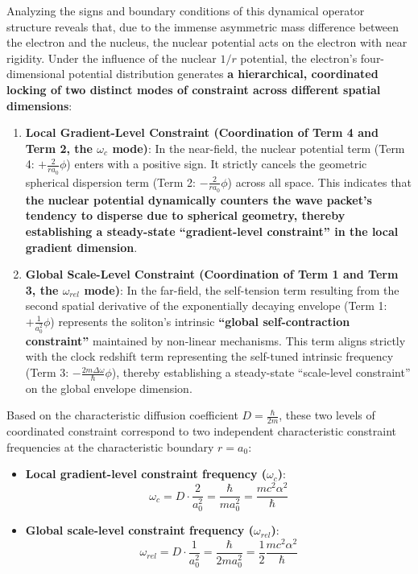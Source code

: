 \documentclass[12pt, a4paper]{article}
\begin{document}
Analyzing the signs and boundary conditions of this dynamical operator structure reveals that, due to the immense asymmetric mass difference between the electron and the nucleus, the nuclear potential acts on the electron with near rigidity. Under the influence of the nuclear $1/r$ potential, the electron's four-dimensional potential distribution generates \textbf{a hierarchical, coordinated locking of two distinct modes of constraint across different spatial dimensions}:
\begin{enumerate}
    \item \textbf{Local Gradient-Level Constraint (Coordination of Term 4 and Term 2, the $\omega_c$ mode)}: In the near-field, the nuclear potential term (Term 4: $+\frac{2}{ra_0}\phi$) enters with a positive sign. It strictly cancels the geometric spherical dispersion term (Term 2: $-\frac{2}{ra_0}\phi$) across all space. This indicates that \textbf{the nuclear potential dynamically counters the wave packet's tendency to disperse due to spherical geometry, thereby establishing a steady-state ``gradient-level constraint'' in the local gradient dimension}.
    \item \textbf{Global Scale-Level Constraint (Coordination of Term 1 and Term 3, the $\omega_{rel}$ mode)}: In the far-field, the self-tension term resulting from the second spatial derivative of the exponentially decaying envelope (Term 1: $+\frac{1}{a_0^2}\phi$) represents the soliton's intrinsic \textbf{``global self-contraction constraint''} maintained by non-linear mechanisms. This term aligns strictly with the clock redshift term representing the self-tuned intrinsic frequency (Term 3: $-\frac{2m\Delta\omega}{\hbar}\phi$), thereby establishing a steady-state ``scale-level constraint'' on the global envelope dimension.
\end{enumerate}

Based on the characteristic diffusion coefficient $D = \frac{\hbar}{2m}$, these two levels of coordinated constraint correspond to two independent characteristic constraint frequencies at the characteristic boundary $r = a_0$:
\begin{itemize}
    \item \textbf{Local gradient-level constraint frequency ($\omega_c$)}:
    \begin{equation}
        \omega_{c} = D \cdot \frac{2}{a_0^2} = \frac{\hbar}{m a_0^2} = \frac{mc^2\alpha^2}{\hbar} 
    \end{equation}
    \item \textbf{Global scale-level constraint frequency ($\omega_{rel}$)}:
    \begin{equation}
        \omega_{rel} = D \cdot \frac{1}{a_0^2} = \frac{\hbar}{2m a_0^2} = \frac{1}{2} \frac{mc^2\alpha^2}{\hbar} 
    \end{equation}
\end{itemize}
\end{document}
